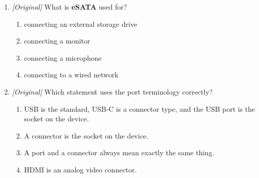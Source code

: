 \documentclass[11pt]{article}
\begin{document}
\begin{enumerate}[label=\textbf{Q\arabic*.}, leftmargin=*]
\begin{enumerate}[label=\Alph*.]
  \end{enumerate}
\item \textit{[Original]} What is \textbf{eSATA} used for?
  \begin{enumerate}[label=\Alph*.]
    \item connecting an external storage drive
    \item connecting a monitor
    \item connecting a microphone
    \item connecting to a wired network
  \end{enumerate}
\item \textit{[Original]} Which statement uses the port terminology
  correctly?
  \begin{enumerate}[label=\Alph*.]
    \item USB is the standard, USB-C is a connector type, and the USB port is
      the socket on the device.
    \item A connector is the socket on the device.
    \item A port and a connector always mean exactly the same thing.
    \item HDMI is an analog video connector.
  \end{enumerate}


\end{enumerate}
\end{document}
